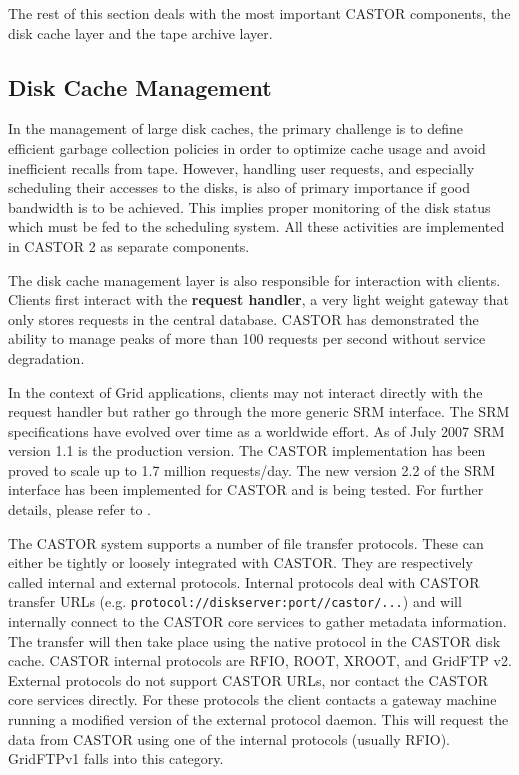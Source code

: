 The rest of this section deals with the most important CASTOR components, the disk
cache layer and the tape archive layer.

\subsection{Disk Cache Management}

In the management of large disk caches, the primary challenge
is to define efficient garbage collection policies in order
to optimize cache usage and avoid inefficient recalls from tape.
However, handling user requests, and especially
scheduling their accesses to the disks, is also of primary
importance if good bandwidth is to be achieved. This
implies proper monitoring of the disk status which must be fed to the scheduling
system. All these activities are implemented in CASTOR 2 as separate
components.

The disk cache management layer is also responsible for interaction with clients.
Clients first interact with the {\bf request handler}, a very light weight gateway that
only stores requests in the central database. CASTOR has
demonstrated the ability to manage peaks of more than 100 requests per second without
service degradation.

In the context of Grid applications, clients may not interact directly with the request
handler but rather go through the more generic SRM interface. The SRM specifications have
evolved over time as a worldwide effort. As of July 2007 SRM version 1.1 is the production
version. The CASTOR implementation has been proved to scale up to 1.7 million requests/day.
The new version 2.2 of the SRM interface has been implemented for CASTOR and is being
tested. For further details, please refer to \cite{srmmsst07}.

The CASTOR system supports a number of file transfer protocols. These can either
be tightly or loosely integrated with CASTOR. They are respectively called
internal and external protocols.
Internal protocols deal with CASTOR transfer URLs
(e.g. \texttt{protocol://disk\-server:port\-//castor/...}) and will
internally connect to the CASTOR core services to gather metadata information.
The transfer will then take place using the native protocol in the CASTOR
disk cache. CASTOR internal protocols are RFIO, ROOT\cite{root},
XROOT\cite{xroot}, and GridFTP v2\cite{globus}.
External protocols do not support CASTOR URLs, nor contact
the CASTOR core services directly. For these protocols the client contacts a gateway
machine running a modified version of the external protocol daemon. This will
request the data from CASTOR using one of the internal protocols (usually RFIO).
GridFTPv1 falls into this category.

